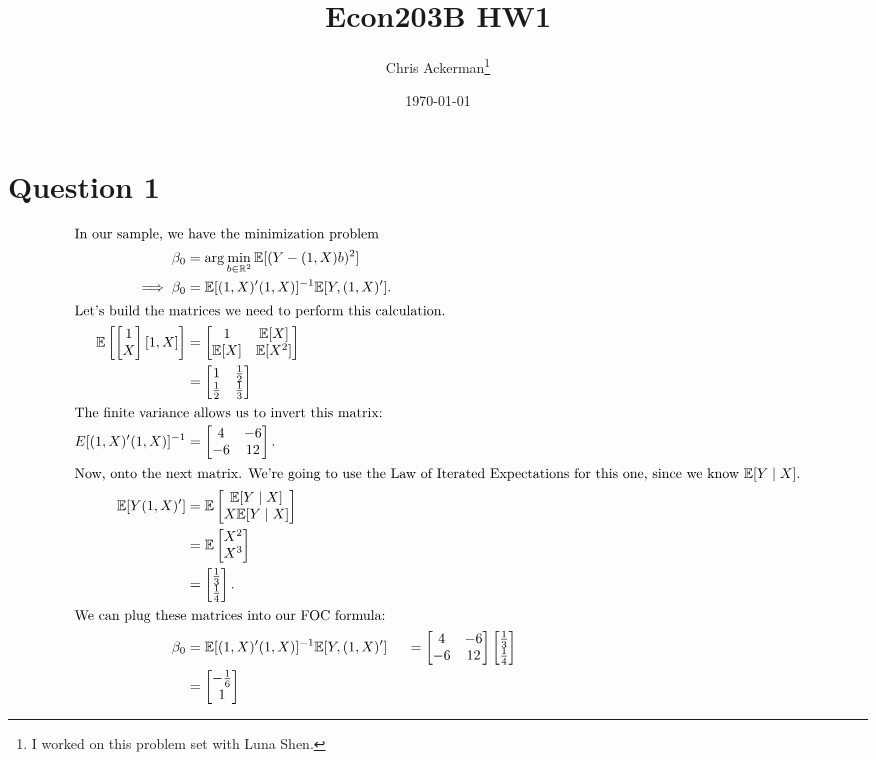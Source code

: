 \documentclass[11pt]{article}
\author{Chris Ackerman\thanks{I worked on this problem set with Luna Shen.}}
\date{\today}
\title{Econ203B HW1}
\newcommand{\R}{\mathbb{R}}
\newcommand{\E}{\mathbb{E}}
\newcommand{\inv}{^{-1}}
\begin{document}
\maketitle
\tableofcontents

\newpage

\section{Question 1}
\label{sec:orgdee1ee2}
 \begin{align*}
\intertext{In our sample, we have the minimization problem}
\beta_0 &= \arg \min_{b \in \R^2} \E [(Y - (1, X)b)^2]\\
\implies \beta_0 &= \E[(1, X)'(1, X)]\inv \E[Y, (1, X)'].\\
\intertext{Let's build the matrices we need to perform this calculation.}
\E \left[\begin{bmatrix}1\\ X \end{bmatrix}[1, X]\right] &= \begin{bmatrix}1 & \E[X] \\ \E[X] & \E[X^2]\end{bmatrix}\\
&= \begin{bmatrix}1 & \frac{1}{2} \\ \frac{1}{2} & \frac{1}{3}\end{bmatrix}\\
\intertext{The finite variance allows us to invert this matrix:}
E[(1, X)' (1, X)]\inv &= \begin{bmatrix}4 & -6\\ -6 & 12 \end{bmatrix}.\\
\intertext{Now, onto the next matrix. We're going to use the Law of Iterated Expectations for this one, since we know $\E[Y \mid X]$.}
\E[Y (1, X)'] &= \E \begin{bmatrix}\E[Y \mid X] \\ X \E [Y \mid X]\end{bmatrix}\\
&= \E \begin{bmatrix} X^2 \\ X^3 \end{bmatrix}\\
&= \begin{bmatrix}\frac{1}{3} \\ \frac{1}{4}\end{bmatrix}.\\
\intertext{We can plug these matrices into our FOC formula:}
\beta_0 &= \E[(1, X)'(1, X)]\inv \E[Y, (1, X)']\	\
&= \begin{bmatrix}4 & -6 \\ -6 & 12 \end{bmatrix}\begin{bmatrix}\frac{1}{3}\\ \frac{1}{4}\end{bmatrix}\\ &=\begin{bmatrix}- \frac{1}{6} \\ 1\end{bmatrix}
\end{align*}
\end{document}
